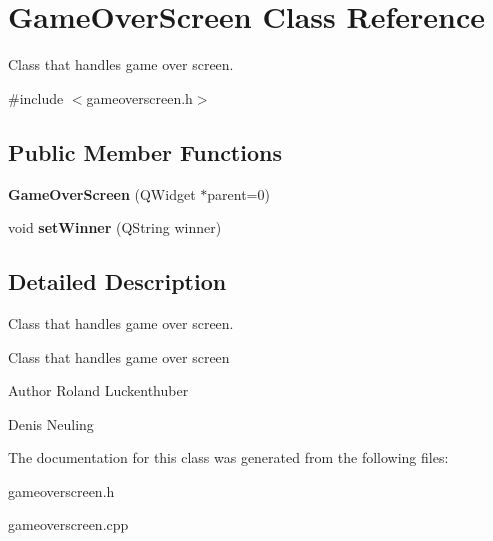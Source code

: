 \hypertarget{classGameOverScreen}{\section{\-Game\-Over\-Screen \-Class \-Reference}
\label{classGameOverScreen}
}


\-Class that handles game over screen.  




{\ttfamily \#include $<$gameoverscreen.\-h$>$}

\subsection*{\-Public \-Member \-Functions}
\begin{DoxyCompactItemize}
\item 
\hypertarget{classGameOverScreen_af87dfa0db651123e3a77265b5c66da13}{{\bfseries \-Game\-Over\-Screen} (\-Q\-Widget $\ast$parent=0)}\label{classGameOverScreen_af87dfa0db651123e3a77265b5c66da13}

\item 
\hypertarget{classGameOverScreen_a9767d775fcb476810e1d3690e631aa62}{void {\bfseries set\-Winner} (\-Q\-String winner)}\label{classGameOverScreen_a9767d775fcb476810e1d3690e631aa62}

\end{DoxyCompactItemize}


\subsection{\-Detailed \-Description}
\-Class that handles game over screen. 

\-Class that handles game over screen

\begin{DoxyAuthor}{\-Author}
\-Roland \-Luckenthuber 

\-Denis \-Neuling 
\end{DoxyAuthor}


\-The documentation for this class was generated from the following files\-:\begin{DoxyCompactItemize}
\item 
gameoverscreen.\-h\item 
gameoverscreen.\-cpp\end{DoxyCompactItemize}
